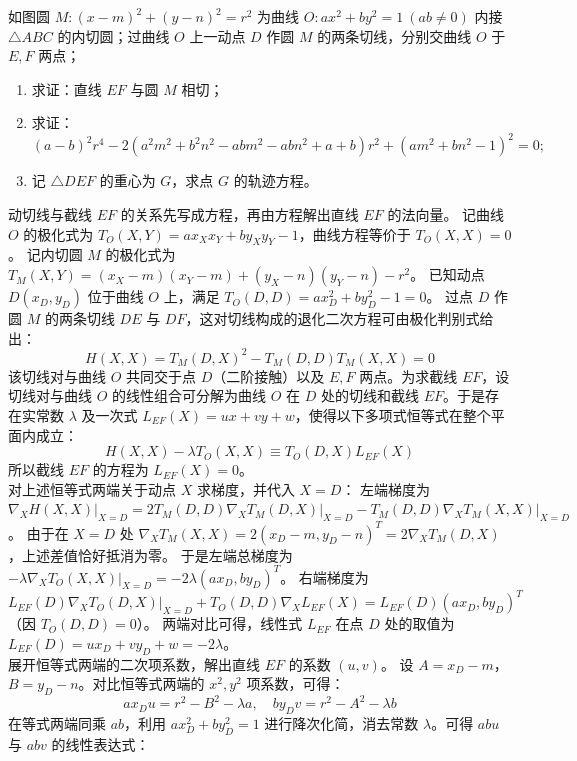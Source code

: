 \begin{example}
如图圆 \(M: (x - m)^2 + (y - n)^2 = r^2\) 为曲线 \(O: ax^2 + by^2 = 1\ (ab \neq 0)\) 内接 \(\triangle ABC\) 的内切圆；过曲线 \(O\) 上一动点 \(D\) 作圆 \(M\) 的两条切线，分别交曲线 \(O\) 于 \(E, F\) 两点；
\begin{enumerate}
\item[(4)] 求证：直线 \(EF\) 与圆 \(M\) 相切；
\item[(5)] 求证：
\[
(a - b)^2 r^4 - 2(a^2 m^2 + b^2 n^2 - abm^2 - abn^2 + a + b) r^2 + (am^2 + bn^2 - 1)^2 = 0;
\]
\item[(6)] 记 \(\triangle DEF\) 的重心为 \(G\)，求点 \(G\) 的轨迹方程。
\end{enumerate}
\end{example}
\begin{solution}
动切线与截线 $EF$ 的关系先写成方程，再由方程解出直线 $EF$ 的法向量。
记曲线 $O$ 的极化式为 $T_O(X, Y) = a x_X x_Y + b y_X y_Y - 1$，曲线方程等价于 $T_O(X, X) = 0$。
记内切圆 $M$ 的极化式为 $T_M(X, Y) = (x_X - m)(x_Y - m) + (y_X - n)(y_Y - n) - r^2$。
已知动点 $D(x_D, y_D)$ 位于曲线 $O$ 上，满足 $T_O(D, D) = a x_D^2 + b y_D^2 - 1 = 0$。
过点 $D$ 作圆 $M$ 的两条切线 $DE$ 与 $DF$，这对切线构成的退化二次方程可由极化判别式给出：
$$ H(X, X) = T_M(D, X)^2 - T_M(D, D) T_M(X, X) = 0 $$
该切线对与曲线 $O$ 共同交于点 $D$（二阶接触）以及 $E, F$ 两点。为求截线 $EF$，设切线对与曲线 $O$ 的线性组合可分解为曲线 $O$ 在 $D$ 处的切线和截线 $EF$。于是存在实常数 $\lambda$ 及一次式 $L_{EF}(X) = ux + vy + w$，使得以下多项式恒等式在整个平面内成立：
$$ H(X, X) - \lambda T_O(X, X) \equiv T_O(D, X) L_{EF}(X) $$
所以截线 $EF$ 的方程为 $L_{EF}(X) = 0$。\\
对上述恒等式两端关于动点 $X$ 求梯度，并代入 $X = D$：
左端梯度为 $\nabla_X H(X,X)\big|_{X=D} = 2 T_M(D,D) \nabla_X T_M(D,X)\big|_{X=D} - T_M(D,D) \nabla_X T_M(X,X)\big|_{X=D}$。
由于在 $X=D$ 处 $\nabla_X T_M(X,X) = 2(x_D-m, y_D-n)^T = 2 \nabla_X T_M(D,X)$，上述差值恰好抵消为零。
于是左端总梯度为 $-\lambda \nabla_X T_O(X,X)\big|_{X=D} = -2\lambda (a x_D, b y_D)^T$。
右端梯度为 $L_{EF}(D) \nabla_X T_O(D,X)\big|_{X=D} + T_O(D,D) \nabla_X L_{EF}(X) = L_{EF}(D) (a x_D, b y_D)^T$（因 $T_O(D,D)=0$）。
两端对比可得，线性式 $L_{EF}$ 在点 $D$ 处的取值为 $L_{EF}(D) = u x_D + v y_D + w = -2\lambda$。\\
展开恒等式两端的二次项系数，解出直线 $EF$ 的系数 $(u, v)$。
设 $A = x_D - m$，$B = y_D - n$。对比恒等式两端的 $x^2, y^2$ 项系数，可得：
$$ a x_D u = r^2 - B^2 - \lambda a, \quad b y_D v = r^2 - A^2 - \lambda b $$
在等式两端同乘 $ab$，利用 $a x_D^2 + b y_D^2 = 1$ 进行降次化简，消去常数 $\lambda$。可得 $ab u$ 与 $ab v$ 的线性表达式：

\end{solution}
